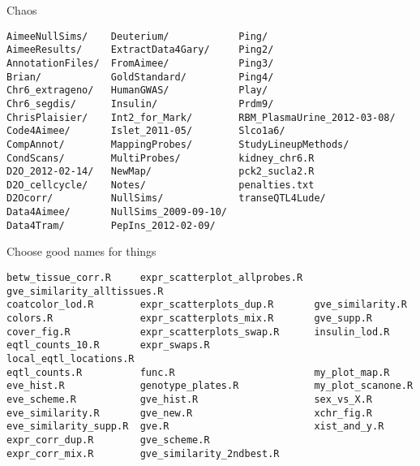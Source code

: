 \documentclass[aspectratio=169,12pt,t]{beamer}
\begin{document}
\begin{frame}[fragile,c]{Chaos}

\begin{center}
\begin{minipage}[c]{11.33cm}
\begin{semiverbatim}
\lstset{basicstyle=\scriptsize}
\begin{lstlisting}[linewidth=11.33cm]
AimeeNullSims/    Deuterium/            Ping/
AimeeResults/     ExtractData4Gary/     Ping2/
AnnotationFiles/  FromAimee/            Ping3/
Brian/            GoldStandard/         Ping4/
Chr6_extrageno/   HumanGWAS/            Play/
Chr6_segdis/      Insulin/              Prdm9/
ChrisPlaisier/    Int2_for_Mark/        RBM_PlasmaUrine_2012-03-08/
Code4Aimee/       Islet_2011-05/        Slco1a6/
CompAnnot/        MappingProbes/        StudyLineupMethods/
CondScans/        MultiProbes/          kidney_chr6.R
D2O_2012-02-14/   NewMap/               pck2_sucla2.R
D2O_cellcycle/    Notes/                penalties.txt
D2Ocorr/          NullSims/             transeQTL4Lude/
Data4Aimee/       NullSims_2009-09-10/
Data4Tram/        PepIns_2012-02-09/
\end{lstlisting}
\end{semiverbatim}
\end{minipage}
\end{center}


\end{frame}


\begin{frame}[fragile,c]{Choose good names for things}

\begin{center}
\begin{minipage}[c]{13.7cm}
\begin{semiverbatim}
\lstset{basicstyle=\scriptsize}
\begin{lstlisting}[linewidth=13.7cm]
betw_tissue_corr.R     expr_scatterplot_allprobes.R  gve_similarity_alltissues.R
coatcolor_lod.R        expr_scatterplots_dup.R       gve_similarity.R
colors.R               expr_scatterplots_mix.R       gve_supp.R
cover_fig.R            expr_scatterplots_swap.R      insulin_lod.R
eqtl_counts_10.R       expr_swaps.R                  local_eqtl_locations.R
eqtl_counts.R          func.R                        my_plot_map.R
eve_hist.R             genotype_plates.R             my_plot_scanone.R
eve_scheme.R           gve_hist.R                    sex_vs_X.R
eve_similarity.R       gve_new.R                     xchr_fig.R
eve_similarity_supp.R  gve.R                         xist_and_y.R
expr_corr_dup.R        gve_scheme.R
expr_corr_mix.R        gve_similarity_2ndbest.R
\end{lstlisting}
\end{semiverbatim}
\end{minipage}
\end{center}

\note{}

\end{frame}
\end{document}
